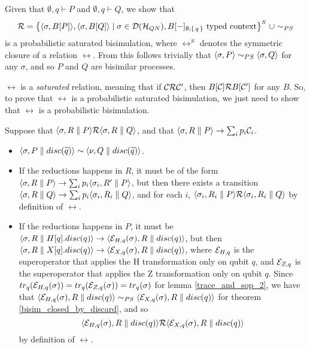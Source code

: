 Given that $\emptyset, {q} \vdash P$ and $\emptyset, {q} \vdash Q$, we show that
\[\mathcal{R} = \big\{\langle\sigma, B[P]\rangle, \langle\sigma, B[Q]\rangle \mid \sigma \in \mathcal{D}(\mathcal{H}_{QN}), B[{-}]_{\emptyset; \set{q}} \text{ typed context}\big\}^S\ \cup \sim_{PS}
\]
is a probabilistic saturated bisimulation, where $\rel^S$ denotes the symmetric closure of a relation $\rel$. From this follows trivially that $\langle\sigma, P\rangle \sim_{PS} \langle\sigma, Q\rangle$ for any $\sigma$, and so $P$ and $Q$ are bisimilar processes.

$\rel$ is a \textit{saturated} relation, meaning that if $\mathcal{C} \mathcal{R} \mathcal{C}'$, then $B[\mathcal{C}] \mathcal{R} B[\mathcal{C}']$ for any $B$. So, to prove that $\rel$ is a probabilistic saturated bisimulation, we just need to show that $\rel$ is a probabilistic bisimulation.

Suppose that $\langle\sigma, R \parallel P\rangle \mathcal{R} \langle\sigma, R \parallel Q\rangle$, and that $\langle\sigma, R \parallel P\rangle \rightarrow \sum_i p_i \mathcal{C}_i$.\begin{itemize}
\item $\langle\sigma, P \parallel disc(\widetilde{q})\rangle \sim \langle\nu, Q \parallel disc(\widetilde{q})\rangle$.
\item If the reductions happens in $R$, it must be of the form $\langle\sigma, R \parallel P\rangle \rightarrow \sum_i p_i \langle\sigma_i, R' \parallel P\rangle$, but then there exists a transition $\langle\sigma, R \parallel Q\rangle \rightarrow \sum_i p_i \langle\sigma_i, R_i \parallel Q\rangle$, and for each $i$, $\langle\sigma_i, R_i \parallel P\rangle \mathcal{R} \langle\sigma_i, R_i \parallel Q\rangle$ by definition of $\rel$.
\item If the reductions happens in $P$, it must be 
 $\langle\sigma, R \parallel H[q].disc(q)\rangle \rightarrow \langle\mathcal{E}_{H, q}(\sigma), R \parallel disc(q)\rangle$, but then  $\langle\sigma, R \parallel X[q].disc(q)\rangle \rightarrow \langle\mathcal{E}_{X, q}(\sigma), R \parallel disc(q)\rangle$, where $\mathcal{E}_{H, q}$ is the superoperator that applies the H transformation only on qubit $q$, and $\mathcal{E}_{Z, q}$ is the superoperator that applies the Z transformation only on qubit $q$. 
Since $tr_q(\mathcal{E}_{H, q}(\sigma)) = tr_q(\mathcal{E}_{Z, q}(\sigma)) = tr_q(\sigma)$ for lemma \ref{trace_and_sop_2}, we have that $\langle\mathcal{E}_{H, q}(\sigma), R \parallel disc(q)\rangle \sim_{PS} \langle\mathcal{E}_{X, q}(\sigma), R \parallel disc(q)\rangle$ for theorem \ref{bisim_closed_by_discard}, and so $$\langle\mathcal{E}_{H, q}(\sigma), R \parallel disc(q)\rangle \mathcal{R} \langle\mathcal{E}_{X, q}(\sigma), R \parallel disc(q)\rangle$$ by definition of $\rel$.
 
\end{itemize}
